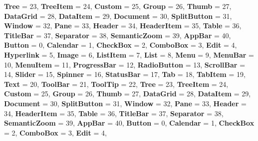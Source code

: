 \begin{DoxyCompactItemize}
\newline
{\bfseries Tree} = 23, 
{\bfseries Tree\+Item} = 24, 
{\bfseries Custom} = 25, 
{\bfseries Group} = 26, 
\newline
{\bfseries Thumb} = 27, 
{\bfseries Data\+Grid} = 28, 
{\bfseries Data\+Item} = 29, 
{\bfseries Document} = 30, 
\newline
{\bfseries Split\+Button} = 31, 
{\bfseries Window} = 32, 
{\bfseries Pane} = 33, 
{\bfseries Header} = 34, 
\newline
{\bfseries Header\+Item} = 35, 
{\bfseries Table} = 36, 
{\bfseries Title\+Bar} = 37, 
{\bfseries Separator} = 38, 
\newline
{\bfseries Semantic\+Zoom} = 39, 
{\bfseries App\+Bar} = 40, 
{\bfseries Button} = 0, 
{\bfseries Calendar} = 1, 
\newline
{\bfseries Check\+Box} = 2, 
{\bfseries Combo\+Box} = 3, 
{\bfseries Edit} = 4, 
{\bfseries Hyperlink} = 5, 
\newline
{\bfseries Image} = 6, 
{\bfseries List\+Item} = 7, 
{\bfseries List} = 8, 
{\bfseries Menu} = 9, 
\newline
{\bfseries Menu\+Bar} = 10, 
{\bfseries Menu\+Item} = 11, 
{\bfseries Progress\+Bar} = 12, 
{\bfseries Radio\+Button} = 13, 
\newline
{\bfseries Scroll\+Bar} = 14, 
{\bfseries Slider} = 15, 
{\bfseries Spinner} = 16, 
{\bfseries Status\+Bar} = 17, 
\newline
{\bfseries Tab} = 18, 
{\bfseries Tab\+Item} = 19, 
{\bfseries Text} = 20, 
{\bfseries Tool\+Bar} = 21, 
\newline
{\bfseries Tool\+Tip} = 22, 
{\bfseries Tree} = 23, 
{\bfseries Tree\+Item} = 24, 
{\bfseries Custom} = 25, 
\newline
{\bfseries Group} = 26, 
{\bfseries Thumb} = 27, 
{\bfseries Data\+Grid} = 28, 
{\bfseries Data\+Item} = 29, 
\newline
{\bfseries Document} = 30, 
{\bfseries Split\+Button} = 31, 
{\bfseries Window} = 32, 
{\bfseries Pane} = 33, 
\newline
{\bfseries Header} = 34, 
{\bfseries Header\+Item} = 35, 
{\bfseries Table} = 36, 
{\bfseries Title\+Bar} = 37, 
\newline
{\bfseries Separator} = 38, 
{\bfseries Semantic\+Zoom} = 39, 
{\bfseries App\+Bar} = 40, 
{\bfseries Button} = 0, 
\newline
{\bfseries Calendar} = 1, 
{\bfseries Check\+Box} = 2, 
{\bfseries Combo\+Box} = 3, 
{\bfseries Edit} = 4, 
\newline

\end{DoxyCompactItemize}
